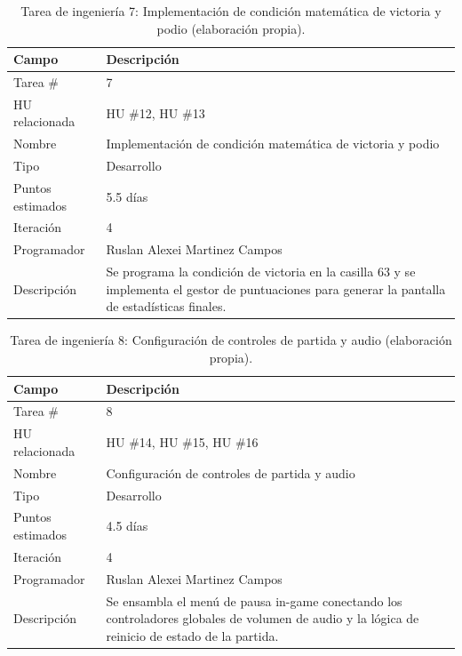 \begin{table}[H]
\centering
\caption{Tarea de ingeniería 7: Implementación de condición matemática de victoria y podio (elaboración propia).\label{tab:ti7}}
\begin{tabular}{|p{}|p{}|}
\hline
\textbf{Campo} & \textbf{Descripción} \\
\hline
Tarea \# & 7 \\
\hline
HU relacionada & HU \#12, HU \#13 \\
\hline
Nombre & Implementación de condición matemática de victoria y podio \\
\hline
Tipo & Desarrollo \\
\hline
Puntos estimados & 5.5 días \\
\hline
Iteración & 4 \\
\hline
Programador & Ruslan Alexei Martinez Campos \\
\hline
Descripción & Se programa la condición de victoria en la casilla 63 y se implementa el gestor de puntuaciones para generar la pantalla de estadísticas finales. \\
\hline
\end{tabular}
\end{table}

\begin{table}[H]
\centering
\caption{Tarea de ingeniería 8: Configuración de controles de partida y audio (elaboración propia).\label{tab:ti8}}
\begin{tabular}{|p{}|p{}|}
\hline
\textbf{Campo} & \textbf{Descripción} \\
\hline
Tarea \# & 8 \\
\hline
HU relacionada & HU \#14, HU \#15, HU \#16 \\
\hline
Nombre & Configuración de controles de partida y audio \\
\hline
Tipo & Desarrollo \\
\hline
Puntos estimados & 4.5 días \\
\hline
Iteración & 4 \\
\hline
Programador & Ruslan Alexei Martinez Campos \\
\hline
Descripción & Se ensambla el menú de pausa in-game conectando los controladores globales de volumen de audio y la lógica de reinicio de estado de la partida. \\
\hline
\end{tabular}
\end{table}

